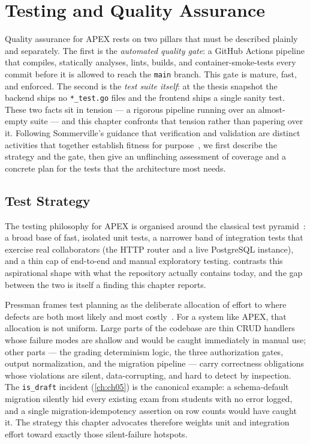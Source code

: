 \chapter{Testing and Quality Assurance}\label{ch:ch09}

Quality assurance for APEX rests on two pillars that must be described
plainly and separately. The first is the \emph{automated quality gate}:
a GitHub Actions pipeline that compiles, statically analyses, lints,
builds, and container-smoke-tests every commit before it is allowed to
reach the \texttt{main} branch. This gate is mature, fast, and enforced.
The second is the \emph{test suite itself}: at the thesis snapshot the
backend ships no \texttt{*\_test.go} files and the frontend ships a
single sanity test. These two facts sit in tension --- a rigorous
pipeline running over an almost-empty suite --- and this chapter
confronts that tension rather than papering over it. Following
Sommerville's guidance that verification and validation are distinct
activities that together establish fitness for purpose~\cite{sommerville-se},
we first describe the strategy and the gate, then give an unflinching
assessment of coverage and a concrete plan for the tests that the
architecture most needs.

\section{Test Strategy}

The testing philosophy for APEX is organised around the classical test
pyramid~\cite{fowler2002patterns}: a broad base of fast, isolated unit
tests, a narrower band of integration tests that exercise real
collaborators (the HTTP router and a live PostgreSQL instance), and a
thin cap of end-to-end and manual exploratory testing.
 contrasts this aspirational shape with what the
repository actually contains today, and the gap between the two is
itself a finding this chapter reports.



Pressman frames test planning as the deliberate allocation of effort to
where defects are both most likely and most costly~\cite{pressman-se}.
For a system like APEX, that allocation is not uniform. Large parts of
the codebase are thin CRUD handlers whose failure modes are shallow and
would be caught immediately in manual use; other parts --- the grading
determinism logic, the three authorization gates, output normalization,
and the migration pipeline --- carry correctness obligations whose
violations are silent, data-corrupting, and hard to detect by
inspection. The \texttt{is\_draft} incident (\cref{ch:ch05}) is the
canonical example: a schema-default migration silently hid every
existing exam from students with no error logged, and a single
migration-idempotency assertion on row counts would have caught it. The
strategy this chapter advocates therefore weights unit and integration
effort toward exactly those silent-failure hotspots.

